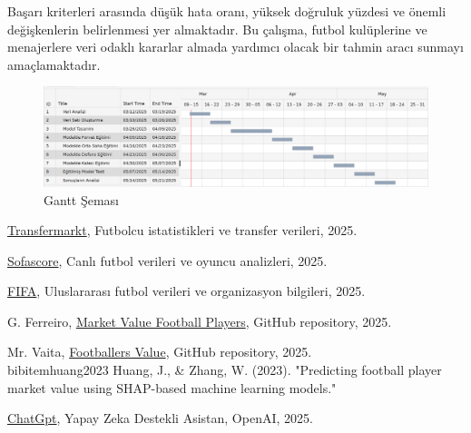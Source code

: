 \documentclass{article}
\begin{document}
Başarı kriterleri arasında düşük hata oranı, yüksek doğruluk yüzdesi ve önemli değişkenlerin belirlenmesi yer almaktadır. Bu çalışma, futbol kulüplerine ve menajerlere veri odaklı kararlar almada yardımcı olacak bir tahmin aracı sunmayı amaçlamaktadır.

\renewcommand{\figurename}{Resim}
\begin{figure}[htp]
    \centering
    \includegraphics[width=\textwidth]{Chart.png} 
    \caption{Gantt Şeması}
\end{figure}

\renewcommand{\refname}{Kaynakça}
\begin{thebibliography}{9}
\href{https://www.transfermarkt.com.tr/}{Transfermarkt}, Futbolcu istatistikleri ve transfer verileri, 2025.

\href{https://www.sofascore.com/tr/}{Sofascore}, Canlı futbol verileri ve oyuncu analizleri, 2025.

\href{https://www.fifa.com/}{FIFA}, Uluslararası futbol verileri ve organizasyon bilgileri, 2025.


G. Ferreiro, \href{https://github.com/gonzaferreiro/Market_value_football_players}{Market Value Football Players}, GitHub repository, 2025.

Mr. Vaita, \href{https://github.com/mrvaita/footballers_value}{Footballers Value}, GitHub repository, 2025.
\\bibitem{huang2023} 
Huang, J., \& Zhang, W. (2023). "Predicting football player market value using SHAP-based machine learning models." 

 
\href{https://chatgpt.com/c/67cec41b-6bb4-8012-87f6-43de845c25bb}{ChatGpt}, Yapay Zeka Destekli Asistan, OpenAI, 2025.


\end{thebibliography}
\end{document}
